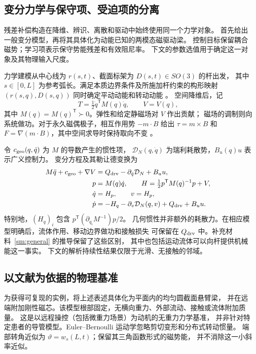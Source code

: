 \subsection{变分力学与保守项、受迫项的分离}
\label{mech:variational}
残差补偿构造在降维、辨识、离散和驱动中始终使用同一个力学对象。
首先给出一般变分模型，再将其具体化为动能已知的两模态磁驱动梁。
控制目标保留耦合磁势；学习项表示保守势能残差和有效阻尼率。
下文的参数选值用于确定这一对象及其物理输入尺度。

力学建模从中心线为 $r(s,t)$、截面标架为 $D(s,t)\in SO(3)$ 的杆出发，
其中 $s\in[0,L]$ 为参考弧长。满足本质边界条件及所施加杆约束的构形映射
$(r(s,q),D(s,q))$ 同时确定平动动能和转动动能 \citep{simo,antman}。
空间降维后，记
\begin{equation}
 T=\tfrac12\dot q^{\mathsf T}M(q)\dot q,\qquad V=V(q),
 \label{mech:general-energy}
\end{equation}
其中 $M(q)=M(q)^{\mathsf T}\succ0$。弹性和给定静磁场对 $V$ 作出贡献；
磁场的调制则向系统做功。对于永久磁偶极子，相互作用势 $-m\cdot B$ 给出
$\tau=m\times B$ 和 $F=\nabla(m\cdot B)$，其中空间求导时保持取向不变
\citep{abbott}。

令 $c_{\rm geo}(q,\dot q)$ 为 $M$ 的导数产生的惯性项，
$\mathcal D_N(q,\dot q)$ 为瑞利耗散势，$B_u(q)u$ 表示广义控制力。
变分方程及其勒让德变换为
\begin{align}
 M\ddot q+c_{\rm geo}+\nabla V
 &=Q_{\rm drv}-\partial_{\dot q}\mathcal D_N+B_u u,
 \label{mech:general-lagrange}\\
 p&=M(q)\dot q,\qquad
 H=\tfrac12p^{\mathsf T}M(q)^{-1}p+V,\nonumber\\
 \dot q&=H_p,\qquad v=H_p,\nonumber\\
 \dot p&=-H_q-\partial_v\mathcal D_N(q,v)+Q_{\rm drv}+B_u u.
 \label{mech:general-hamiltonian}
\end{align}
特别地，$(H_q)_i$ 包含 $p^{\mathsf T}(\partial_{q_i}M^{-1})p/2$。
几何惯性并非额外的耗散力。在相应模型明确后，流体作用、移动边界做功和接触损失
可保留在 $Q_{\rm drv}$ 中。补充材料~\ref{sm:general} 的推导保留了这些区别，
其中也包括运动流体可以向杆提供机械能这一事实。
下文的解析持续性结果仅限于光滑、无接触的邻域。

\subsection{以文献为依据的物理基准}
\label{mech:benchmark}
为获得可复现的实例，将上述表述具体化为平面内的均匀圆截面悬臂梁，
并在远端附加刚性磁芯。该模型根部固定，无横向重力、外部流动、接触或流体附加质量。
这是以远程操控（包括微重力场景）为动机的无重力力学基准，
并非针对特定患者的导管模型。Euler--Bernoulli 运动学忽略剪切变形和分布式转动惯量。
端部转角近似为 $\vartheta=w_s(L,t)$；保留其三角函数形式的磁势能，
并不消除这一小斜率近似。

